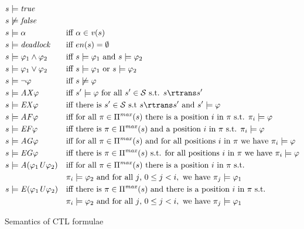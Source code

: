 \documentclass{article}
\newcommand{\ltsstates}{\ensuremath{\mathcal{S}}\xspace} %
\newcommand{\deadlock}{\ensuremath{\mathit{deadlock}}\xspace}
\newcommand{\true}{\ensuremath{\mathit{true}}\xspace}
\newcommand{\false}{\ensuremath{\mathit{false}}\xspace}
\newcommand{\maxpaths}{\ensuremath{\Pi^{\mathit{max}}}\xspace}
\newcommand{\en}{\ensuremath{en}\xspace}
\newcommand{\apeval}{\ensuremath{\mathit{v}}\xspace}
\begin{document}
\begin{table}[t]
\raggedbottom
\begin{align*} 
    &s \models \true && \\
    &s \not\models \false &&  \\
    &s \models \alpha && \mbox{iff } \alpha \in \apeval(s) \\
	&s \models \deadlock &&\mbox{iff } \en(s) = \emptyset \\
	&s \models \varphi_1 \land \varphi_2 &&\mbox{iff } s \models \varphi_1 \mbox{ and } s \models \varphi_2 \\
	&s \models \varphi_1 \lor \varphi_2 &&\mbox{iff } s \models \varphi_1 \mbox{ or } s \models \varphi_2 \\
	&s \models \neg \varphi&&\mbox{iff } s \not\models \varphi\\
	&s \models \mathit{AX}\varphi&& \mbox{iff } s' \models \varphi \mbox{ for all } s' \in \ltsstates \mbox{ s.t. } s \rtrans s' \\ 
&s \models \mathit{EX}\varphi&&\mbox{iff there is } s' \in \ltsstates \mbox{ s.t } s \rtrans s' \mbox{ and } s' \models \varphi \\
	&s \models \mathit{AF}\varphi&&\mbox{iff for all }\pi \in \maxpaths(s) \mbox{ there is a position } i \mbox{ in } \pi \mbox{ s.t. } \pi_i \models \varphi \\
	&s \models \mathit{EF}\varphi&&\mbox{iff there is } \pi \in \maxpaths(s) \mbox{ and a position } i \mbox{ in } \pi \mbox{ s.t. } \pi_i \models \varphi \\
	&s \models \mathit{AG}\varphi&&\mbox{iff for all } \pi \in \maxpaths(s) \mbox{ and for all positions } i \mbox{ in } \pi \mbox{ we have } \pi_i \models \varphi \\
	&s \models \mathit{EG}\varphi &&\mbox{iff there is }\pi \in \maxpaths(s) \mbox{ s.t. for all positions } i \mbox{ in } \pi \mbox{ we have } \pi_i \models \varphi \\
	&s \models \mathit{A}(\varphi_1 \mathit{U} \varphi_2) &&\mbox{iff for all }\pi \in \maxpaths(s) \mbox{ there is a position } i \mbox{  in } \pi  \mbox{ s.t. }\\
	& && \pi_i \models \varphi_2 \mbox{ and for all $j$, } 0 \leq j < i, \mbox{ we have } \pi_j \models \varphi_1 \\
	&s \models \mathit{E}(\varphi_1 \mathit{U} \varphi_2) &&\mbox{iff there is }\pi \in \maxpaths(s) \mbox{ and there is a position } i \mbox{ in } \pi \mbox{ s.t. } \\
	& && \pi_i \models \varphi_2 \mbox{ and for all $j$, } 0 \leq j < i, \mbox{ we have } \pi_j \models \varphi_1
\end{align*}
\caption{Semantics of CTL formulae} \label{tab:CTLsemantics}
\end{table}
\end{document}
